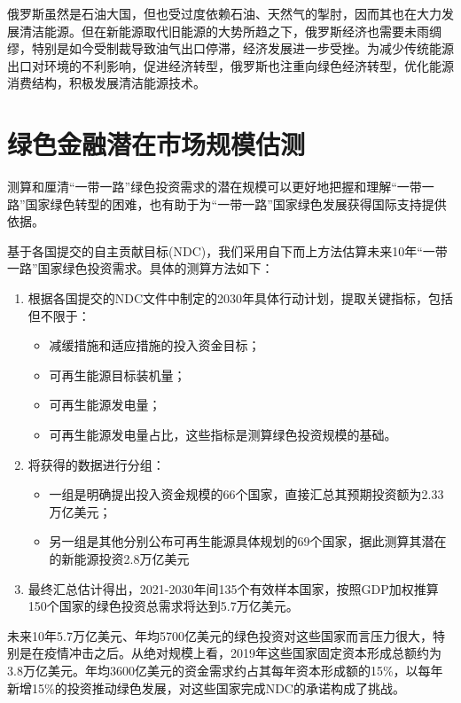 \documentclass[a4paper,12pt]{ctexart}
\begin{document}
俄罗斯虽然是石油大国，但也受过度依赖石油、天然气的掣肘，因而其也在大力发展清洁能源。但在新能源取代旧能源的大势所趋之下，俄罗斯经济也需要未雨绸缪，特别是如今受制裁导致油气出口停滞，经济发展进一步受挫。为减少传统能源出口对环境的不利影响，促进经济转型，俄罗斯也注重向绿色经济转型，优化能源消费结构，积极发展清洁能源技术。
\section*{绿色金融潜在市场规模估测}
测算和厘清“一带一路”绿色投资需求的潜在规模可以更好地把握和理解“一带一路”国家绿色转型的困难，也有助于为“一带一路”国家绿色发展获得国际支持提供依据。

基于各国提交的自主贡献目标(NDC)，我们采用自下而上方法估算未来10年“一带一路”国家绿色投资需求。具体的测算方法如下：

\begin{enumerate}
    \item 根据各国提交的NDC文件中制定的2030年具体行动计划，提取关键指标，包括但不限于：
          \begin{itemize}
              \item 减缓措施和适应措施的投入资金目标；
              \item 可再生能源目标装机量；
              \item 可再生能源发电量；
              \item 可再生能源发电量占比，这些指标是测算绿色投资规模的基础。
          \end{itemize}
    \item 将获得的数据进行分组：
          \begin{itemize}
              \item 一组是明确提出投入资金规模的66个国家，直接汇总其预期投资额为2.33万亿美元；
              \item 另一组是其他分别公布可再生能源具体规划的69个国家，据此测算其潜在的新能源投资2.8万亿美元
          \end{itemize}
    \item 最终汇总估计得出，2021-2030年间135个有效样本国家，按照GDP加权推算150个国家的绿色投资总需求将达到5.7万亿美元。
\end{enumerate}

未来10年5.7万亿美元、年均5700亿美元的绿色投资对这些国家而言压力很大，特别是在疫情冲击之后。从绝对规模上看，2019年这些国家固定资本形成总额约为3.8万亿美元。年均3600亿美元的资金需求约占其每年资本形成额的15\%，以每年新增15\%的投资推动绿色发展，对这些国家完成NDC的承诺构成了挑战。
\end{document}
